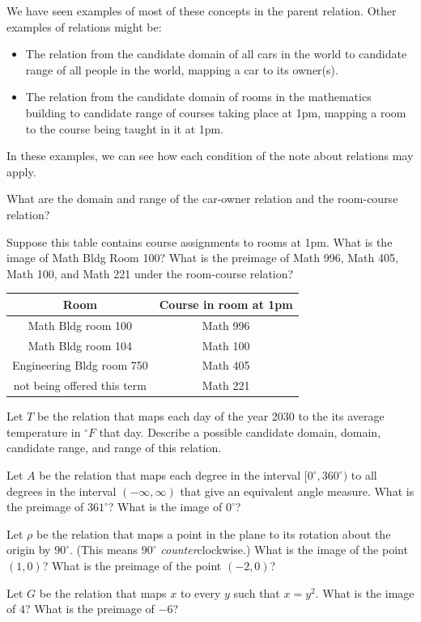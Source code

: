 \documentclass[11pt]{article}
\newenvironment{task}
	{\begin{mdframed}[linecolor=lightgray, linewidth=3pt]\raggedright}
	{\end{mdframed}}
\newcommand\degrees{^\circ}
\theoremstyle{definition}
\begin{document}
We have seen examples of most of these concepts in the parent relation. Other examples of relations might be:
	\begin{itemize}
	\item The relation from the candidate domain of all cars in the world to candidate range of all people in the world, mapping a car to its owner(s).
	\item The relation from the candidate domain of rooms in the mathematics building to candidate range of courses taking place at 1pm, mapping a room to the course being taught in it at 1pm.
	\end{itemize}
In these examples, we can see how each condition of the note about relations may apply.

\begin{task}
What are the domain and range of the car-owner relation and the room-course relation? 

Suppose this table contains course assignments to rooms at 1pm. What is the image of Math Bldg Room 100? What is the preimage of Math 996, Math 405, Math 100, and Math 221 under the room-course relation? 

\begin{center}
\begin{tabular}{|c|c|}
\hline
Room & Course in room at 1pm \\ \hline
Math Bldg room 100 & Math 996 \\ 
Math Bldg room 104 & Math 100 \\ 
Engineering Bldg room 750 & Math 405 \\ 
not being offered this term & Math 221 \\ \hline
\end{tabular}
\end{center}

Let $T$ be the relation that maps each day of the year 2030 to the its average temperature in $\degrees F$ that day. Describe a possible candidate domain, domain, candidate range, and range of this relation.

Let $A$ be the relation that maps each degree in the interval $[0\degrees, 360\degrees)$ to all degrees in the interval $(-\infty,\infty)$ that give an equivalent angle measure. What is the preimage of $361\degrees$? What is the image of $0\degrees$? 

Let $\rho$ be the relation that maps a point in the plane to its rotation about the origin by $90\degrees$.  (This means $90\degrees$ {\it counter}clockwise.) What is the image of the point $(1,0)$? What is the preimage of the point $(-2,0)$? 

Let $G$ be the relation that maps $x$ to every $y$ such that $x=y^2$. What is the image of $4$? What is the preimage of $-6$?

\end{task}
\end{document}
